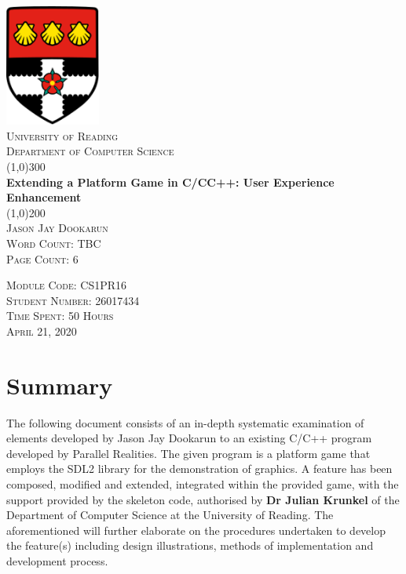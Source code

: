 \documentclass{article}
\begin{document}
\begin{titlepage}
    \begin{center}
        \includegraphics[height= 4cm ]{UoRlogo.png} \\
        [5mm]
        \textsc{\Large University of Reading} \\
        [0.5cm]
        \textsc{\Large Department of Computer Science} \\
        [1cm]

        \line(1,0){300}\\
        [0.25in]
        \huge{\bfseries Extending a Platform Game in C/CC++: User Experience Enhancement}\\
        [2mm]
        \line(1,0){200} \\
        [1cm]
        \textsc{\Large Jason Jay Dookarun} \\
        [2mm]
        \textsc{\large Word Count: TBC} \\
        [2mm]
        \textsc{\large Page Count: 6}\\
        [4cm]
        \end{center}
        \begin{flushright}
        \textsc{\normalsize Module Code: CS1PR16 \\
        Student Number: 26017434 \\
        Time Spent: 50 Hours \\
        April 21, 2020 } \\
        \end{flushright}
\end{titlepage}

\section*{Summary}

The following document consists of an in-depth systematic examination of elements developed by Jason Jay Dookarun to an existing C/C++ program developed by Parallel Realities. The given program is a platform game that employs the SDL2 library for the demonstration of graphics. A feature has been composed, modified and extended, integrated within the provided game, with the support provided by the skeleton code, authorised by \textbf{Dr Julian Krunkel} of the Department of Computer Science at the University of Reading. The aforementioned will further elaborate on the procedures undertaken to develop the feature(s) including design illustrations, methods of implementation and development process.
\end{document}
